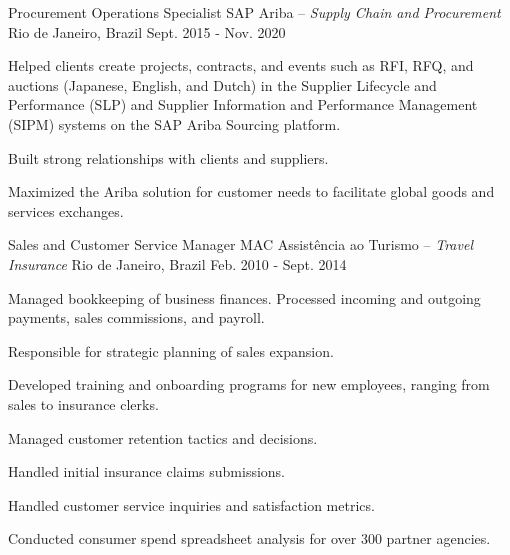 


\begin{cventries}


\cventry
{Procurement Operations Specialist} %
{SAP Ariba \textmd{-- \em{Supply Chain and Procurement}}} %
{Rio de Janeiro, Brazil} %
{Sept. 2015 - Nov. 2020} %
{ %
\begin{cvitems}
\item {Helped clients create projects, contracts, and events such as RFI, RFQ, and auctions (Japanese, English, and Dutch)
in the Supplier Lifecycle and Performance (SLP) and Supplier Information and Performance Management (SIPM)
systems on the SAP Ariba Sourcing platform.}
\item {Built strong relationships with clients and suppliers.}
\item {Maximized the Ariba solution for customer needs to facilitate global goods and services exchanges.}
\end{cvitems}
}


\cventry
{Sales and Customer Service Manager} %
{MAC Assistência ao Turismo \textmd{-- \em{Travel Insurance}}} %
{Rio de Janeiro, Brazil} %
{Feb. 2010 - Sept. 2014} %
{ %
\begin{cvitems}
\item {Managed bookkeeping of business finances. Processed incoming and outgoing payments, sales commissions, and payroll.}
\item {Responsible for strategic planning of sales expansion.}
\item {Developed training and onboarding programs for new employees, ranging from sales to insurance clerks.}
\item {Managed customer retention tactics and decisions.}
\item {Handled initial insurance claims submissions.}
\item {Handled customer service inquiries and satisfaction metrics.}
\item {Conducted consumer spend spreadsheet analysis for over 300 partner agencies.}
\end{cvitems}
}


\end{cventries}
